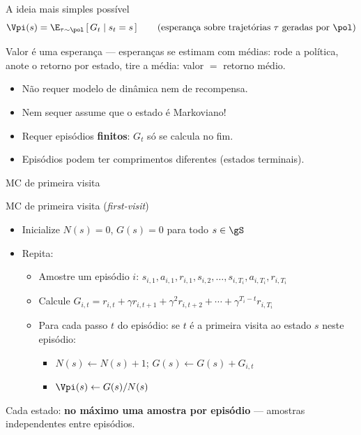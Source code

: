\documentclass[aspectratio=169, 11pt]{beamer}
\begin{document}
\begin{frame}{A ideia mais simples possível}
  \[
    \Vpi(s) = \E_{\tau \sim \pol}\left[\, G_t \mid s_t = s \,\right]
    \qquad \text{(esperança sobre trajetórias $\tau$ geradas por $\pol$)}
  \]

  \begin{ideiabox}
    Valor é uma esperança — esperanças se estimam com médias:
    rode a política, anote o retorno por estado, tire a média:
    \alert{valor $=$ retorno médio}.
  \end{ideiabox}

  \begin{itemize}
    \item Não requer modelo de dinâmica nem de recompensa.
    \item Nem sequer assume que o estado é Markoviano!
    \item Requer episódios \textbf{finitos}: $G_t$ só se calcula no fim.
    \item Episódios podem ter comprimentos diferentes (estados terminais).
  \end{itemize}
\end{frame}

\begin{frame}{MC de primeira visita}
  \begin{algbox}{MC de primeira visita (\emph{first-visit})}
    \begin{itemize}\setlength{\itemsep}{0.2ex}
      \item Inicialize $N(s) = 0$, $G(s) = 0$ para todo $s \in \gS$
      \item Repita:
      \begin{itemize}\setlength{\itemsep}{0.15ex}
        \item Amostre um episódio $i$: $s_{i,1}, a_{i,1}, r_{i,1}, s_{i,2}, \ldots, s_{i,T_i}, a_{i,T_i}, r_{i,T_i}$
        \item Calcule $G_{i,t} = r_{i,t} + \gamma r_{i,t+1} + \gamma^2 r_{i,t+2} + \cdots + \gamma^{T_i - t} r_{i,T_i}$
        \item Para cada passo $t$ do episódio:
          se $t$ é a \alert{primeira} visita ao estado $s$ neste episódio:
          \begin{itemize}
            \item $N(s) \leftarrow N(s) + 1$; \quad $G(s) \leftarrow G(s) + G_{i,t}$
            \item $\Vpi(s) \leftarrow G(s)/N(s)$
          \end{itemize}
      \end{itemize}
    \end{itemize}
  \end{algbox}

  Cada estado: \textbf{no máximo uma amostra por episódio} — amostras
  independentes entre episódios.
\end{frame}
\end{document}
